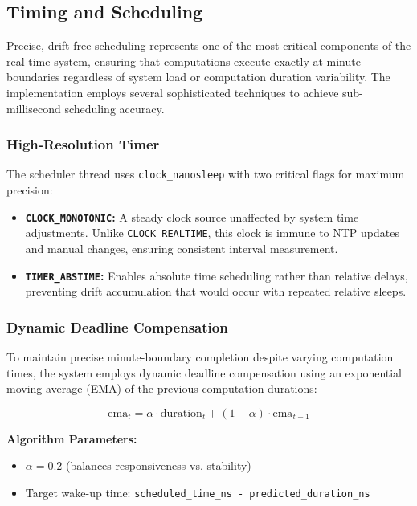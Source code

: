\documentclass[12pt,a4paper]{article}
\begin{document}
\subsection{Timing and Scheduling}

Precise, drift-free scheduling represents one of the most critical components of the real-time system, ensuring that computations execute exactly at minute boundaries regardless of system load or computation duration variability. The implementation employs several sophisticated techniques to achieve sub-millisecond scheduling accuracy.

\subsubsection{High-Resolution Timer}

The scheduler thread uses \texttt{clock\_nanosleep} with two critical flags for maximum precision:

\begin{itemize}
    \item \textbf{\texttt{CLOCK\_MONOTONIC}:} A steady clock source unaffected by system time adjustments. Unlike \texttt{CLOCK\_REALTIME}, this clock is immune to NTP updates and manual changes, ensuring consistent interval measurement.
    \item \textbf{\texttt{TIMER\_ABSTIME}:} Enables absolute time scheduling rather than relative delays, preventing drift accumulation that would occur with repeated relative sleeps.
\end{itemize}

\subsubsection{Dynamic Deadline Compensation}

To maintain precise minute-boundary completion despite varying computation times, the system employs dynamic deadline compensation using an exponential moving average (EMA) of the previous computation durations:

\[
\text{ema}_{t} = \alpha \cdot \text{duration}_{t} + (1 - \alpha) \cdot \text{ema}_{t-1}
\]

\textbf{Algorithm Parameters:}
\begin{itemize}
    \item $\alpha = 0.2$ (balances responsiveness vs. stability)
    \item Target wake-up time: \texttt{scheduled\_time\_ns - predicted\_duration\_ns}
\end{itemize}
\end{document}
